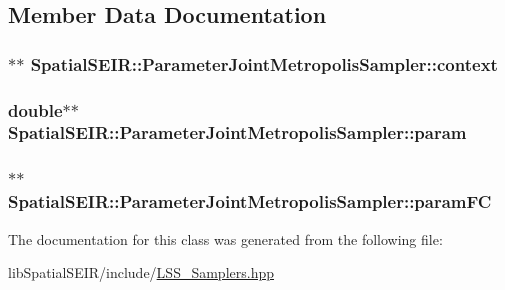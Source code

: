 \subsection{Member Data Documentation}
\hypertarget{classSpatialSEIR_1_1ParameterJointMetropolisSampler_a342dea442e235b1deefe2c16dd3e95e8}{
\subsubsection[{context}]{$\ast$$\ast$ Spatial\-S\-E\-I\-R\-::\-Parameter\-Joint\-Metropolis\-Sampler\-::context}}\label{classSpatialSEIR_1_1ParameterJointMetropolisSampler_a342dea442e235b1deefe2c16dd3e95e8}
\hypertarget{classSpatialSEIR_1_1ParameterJointMetropolisSampler_afead5b10ba404c235e7042670c350eeb}{
\subsubsection[{param}]{\setlength{\rightskip}{0pt plus 5cm}double$\ast$$\ast$ Spatial\-S\-E\-I\-R\-::\-Parameter\-Joint\-Metropolis\-Sampler\-::param}}\label{classSpatialSEIR_1_1ParameterJointMetropolisSampler_afead5b10ba404c235e7042670c350eeb}
\hypertarget{classSpatialSEIR_1_1ParameterJointMetropolisSampler_a2ceafdb76768003ed5eaa4b22ca6afeb}{
\subsubsection[{param\-F\-C}]{$\ast$$\ast$ Spatial\-S\-E\-I\-R\-::\-Parameter\-Joint\-Metropolis\-Sampler\-::param\-F\-C}}\label{classSpatialSEIR_1_1ParameterJointMetropolisSampler_a2ceafdb76768003ed5eaa4b22ca6afeb}


The documentation for this class was generated from the following file\-:\begin{DoxyCompactItemize}
\item 
lib\-Spatial\-S\-E\-I\-R/include/\hyperlink{LSS__Samplers_8hpp}{L\-S\-S\-\_\-\-Samplers.\-hpp}\end{DoxyCompactItemize}
